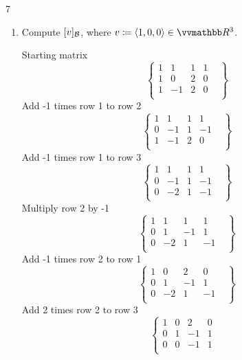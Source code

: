 \documentclass{exercises}
\begin{document}
\begin{exr}{}{7}
\begin{enumerate}
		\item Compute $[v]_{\basis{B}}$, where $v\ceqq \coord{1,0,0}\in \R ^3$.

		Starting matrix
\begin{equation}
\left\{
    \begin{array}{ccc|cl}1&1&1&1&\\1&0&2&0&\\1&-1&2&0&\\\end{array}
\right\}
\end{equation}Add -1 times row 1 to row 2
\begin{equation}
\left\{
    \begin{array}{ccc|cl}1&1&1&1&\\0&-1&1&-1&\\1&-1&2&0&\\\end{array}
\right\}
\end{equation}Add -1 times row 1 to row 3
\begin{equation}
\left\{
    \begin{array}{ccc|cl}1&1&1&1&\\0&-1&1&-1&\\0&-2&1&-1&\\\end{array}
\right\}
\end{equation}Multiply row 2 by -1
\begin{equation}
\left\{
    \begin{array}{ccc|cl}1&1&1&1&\\0&1&-1&1&\\0&-2&1&-1&\\\end{array}
\right\}
\end{equation}Add -1 times row 2 to row 1
\begin{equation}
\left\{
    \begin{array}{ccc|cl}1&0&2&0&\\0&1&-1&1&\\0&-2&1&-1&\\\end{array}
\right\}
\end{equation}Add 2 times row 2 to row 3
\begin{equation}
\left\{
    \begin{array}{ccc|cl}1&0&2&0&\\0&1&-1&1&\\0&0&-1&1&\\\end{array}

\end{equation}
\end{enumerate}
\end{exr}
\end{document}

